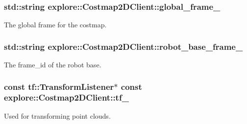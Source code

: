 \subsubsection[{\texorpdfstring{global\+\_\+frame\+\_\+}{global_frame_}}]{\setlength{\rightskip}{0pt plus 5cm}std\+::string explore\+::\+Costmap2\+D\+Client\+::global\+\_\+frame\+\_\+\hspace{0.3cm}{\ttfamily [protected]}}\hypertarget{classexplore_1_1Costmap2DClient_a7a1947e93767e79127bf7579906aea00}{}\label{classexplore_1_1Costmap2DClient_a7a1947e93767e79127bf7579906aea00}


The global frame for the costmap. 

\subsubsection[{\texorpdfstring{robot\+\_\+base\+\_\+frame\+\_\+}{robot_base_frame_}}]{\setlength{\rightskip}{0pt plus 5cm}std\+::string explore\+::\+Costmap2\+D\+Client\+::robot\+\_\+base\+\_\+frame\+\_\+\hspace{0.3cm}{\ttfamily [protected]}}\hypertarget{classexplore_1_1Costmap2DClient_aca46101d77483604e1bf30c705c42c28}{}\label{classexplore_1_1Costmap2DClient_aca46101d77483604e1bf30c705c42c28}


The frame\+\_\+id of the robot base. 

\subsubsection[{\texorpdfstring{tf\+\_\+}{tf_}}]{\setlength{\rightskip}{0pt plus 5cm}const tf\+::\+Transform\+Listener$\ast$ const explore\+::\+Costmap2\+D\+Client\+::tf\+\_\+\hspace{0.3cm}{\ttfamily [protected]}}\hypertarget{classexplore_1_1Costmap2DClient_a1b47f263b4090e67878f388c19007759}{}\label{classexplore_1_1Costmap2DClient_a1b47f263b4090e67878f388c19007759}


Used for transforming point clouds. 

